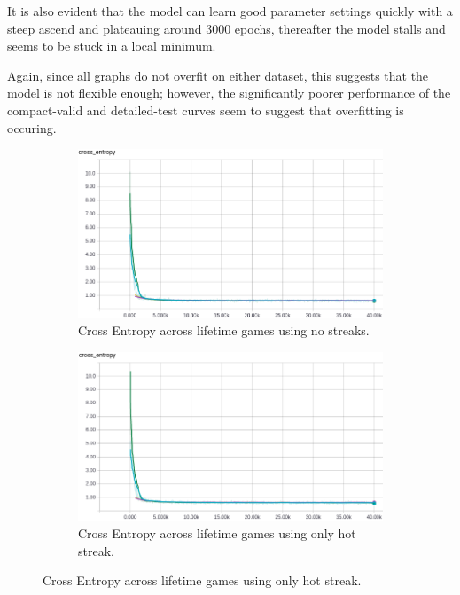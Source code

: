 \documentclass{article} %
\begin{document}
It is also evident that the model can learn good parameter settings quickly with a steep ascend and plateauing around 3000 epochs, thereafter the model stalls and seems to be stuck in a local minimum.

Again, since all graphs do not overfit on either dataset, this suggests that the model is not flexible enough; however, the significantly poorer performance of the compact-valid and detailed-test curves seem to suggest that overfitting is occuring.


\begin{figure}[!htb]
  \begin{subfigure}{0.5\textwidth}
    \includegraphics[width=\linewidth]{plots/model1/lifetime/streak-/crossentropy.png}
    \caption{Cross Entropy across lifetime games using no streaks.}\label{fig:lifetime--crossentropy}
  \end{subfigure}
  \begin{subfigure}{0.5\textwidth}
    \includegraphics[width=\linewidth]{plots/model1/lifetime/streak-h/crossentropy.png}
    \caption{Cross Entropy across lifetime games using only hot streak.}\label{fig:lifetime-h-crossentropy}
  \end{subfigure}



\end{figure}
\end{document}
